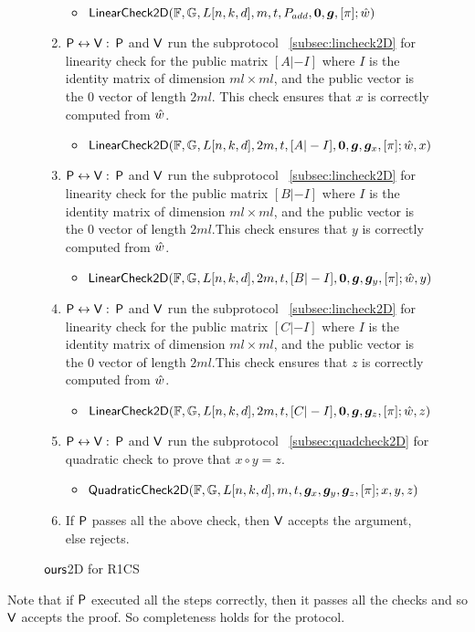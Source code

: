 \begin{figure}[h!]
\begin{framed}
\begin{enumerate}
	\begin{itemize}
		\item $\mathsf{LinearCheck2D}(\mathbb{F}, \mathbb{G}, L[n,k,d], m, t, P_{add}, \bm{0}, \bm{g}, [\pi]; \hat{w})$
	\end{itemize}
	\item $\mathsf{P} \leftrightarrow \mathsf{V}:$ $\mathsf{P}$ and $\mathsf{V}$ run the subprotocol ~\ref{subsec:lincheck2D} for linearity check for the public matrix $[A|-I]$ where $I$ is the identity matrix of dimension $ml \times ml$, and the public vector is the 0 vector of length $2ml$. This check ensures that $x$ is correctly computed from $\hat{w}$.
	\begin{itemize}
		\item $\mathsf{LinearCheck2D}(\mathbb{F}, \mathbb{G}, L[n,k,d], 2m, t, [A|-I], \bm{0}, \bm{g}, \bm{g}_x, [\pi]; \hat{w}, x)$
	\end{itemize}
	\item $\mathsf{P} \leftrightarrow \mathsf{V}:$ $\mathsf{P}$ and $\mathsf{V}$ run the subprotocol ~\ref{subsec:lincheck2D} for linearity check for the public matrix $[B|-I]$ where $I$ is the identity matrix of dimension $ml \times ml$, and the public vector is the 0 vector of length $2ml$.This check ensures that $y$ is correctly computed from $\hat{w}$.
	\begin{itemize}
		\item $\mathsf{LinearCheck2D}(\mathbb{F}, \mathbb{G}, L[n,k,d], 2m, t, [B|-I], \bm{0}, \bm{g}, \bm{g}_y, [\pi]; \hat{w}, y)$
	\end{itemize}
	\item $\mathsf{P} \leftrightarrow \mathsf{V}:$ $\mathsf{P}$ and $\mathsf{V}$ run the subprotocol ~\ref{subsec:lincheck2D} for linearity check for the public matrix $[C|-I]$ where $I$ is the identity matrix of dimension $ml \times ml$, and the public vector is the 0 vector of length $2ml$.This check ensures that $z$ is correctly computed from $\hat{w}$.
	\begin{itemize}
		\item $\mathsf{LinearCheck2D}(\mathbb{F}, \mathbb{G}, L[n,k,d], 2m, t, [C|-I], \bm{0}, \bm{g}, \bm{g}_z, [\pi]; \hat{w}, z)$
	\end{itemize}
	\item $\mathsf{P} \leftrightarrow \mathsf{V}:$ $\mathsf{P}$ and $\mathsf{V}$ run the subprotocol ~\ref{subsec:quadcheck2D} for quadratic check to prove that $x \circ y = z$.
	\begin{itemize}
		\item $\mathsf{QuadraticCheck2D} (\mathbb{F}, \mathbb{G}, L[n,k,d], m, t, \bm{g}_x, \bm{g}_y, \bm{g}_z, [\pi]; x, y, z)$
	\end{itemize}
	\item If $\mathsf{P}$ passes all the above check, then $\mathsf{V}$ accepts the argument, else rejects.
\end{enumerate}
\end{framed}
\caption{$\textsf{ours}$2D for R1CS}
\end{figure}
Note that if $\mathsf{P}$ executed all the steps correctly, then it passes all the checks and so $\mathsf{V}$ accepts the proof. So completeness holds for the protocol.

